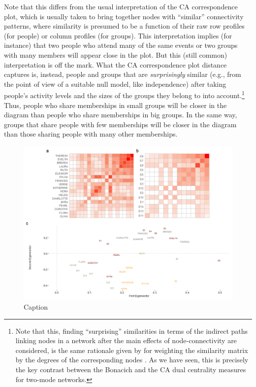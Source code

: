 \documentclass[a4paper,fleqn]{cas-sc}
\begin{document}
Note that this differs from the usual interpretation of the CA correspondence plot, which is usually taken to bring together nodes with ``similar'' connectivity patterns, where similarity is presumed to be a function of their raw row profiles (for people) or column profiles (for groups). This interpretation implies (for instance) that two people who attend many of the same events or two groups with many members will appear close in the plot. But this (still common) interpretation is off the mark. What the CA correspondence plot distance captures is, instead, people and groups that are \textit{surprisingly} similar (e.g., from the point of view of a suitable null model, like independence) after taking people's activity levels and the sizes of the groups they belong to into account.\footnote{Note that this, finding ``surprising'' similarities in terms of the indirect paths linking nodes in a network after the main effects of node-connectivity are considered, is the same rationale given by \cite{leicht2006vertex} for weighting the \citet{katz1953new} similarity matrix by the degrees of the corresponding nodes \citep[see][68, eqs. 2.13 and 2.14]{fouss2016algorithms}. As we have seen, this is precisely the key contrast between the Bonacich and the CA dual centrality measures for two-mode networks.} Thus, people who share memberships in small groups will be closer in the diagram than people who share memberships in big groups. In the same way, groups that share people with few memberships will be closer in the diagram than those sharing people with many other memberships. 

\begin{figure}
    \centering
    \includegraphics[width=1.0\textwidth]{Plots/bon-sim.png}
    \caption{Caption}
    \label{fig:bon-sim}
\end{figure}
\end{document}
